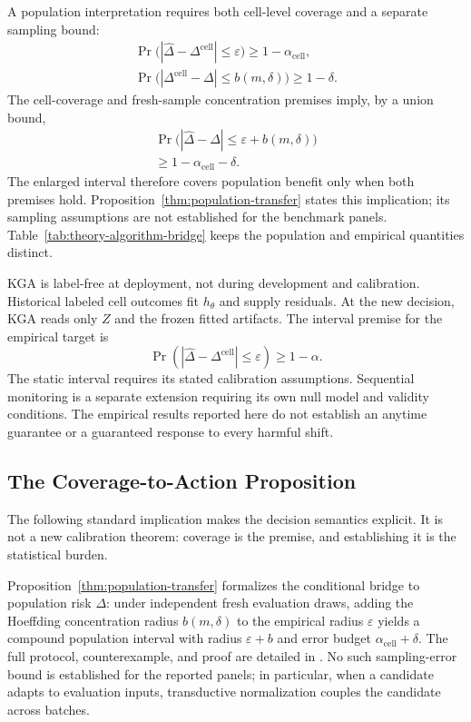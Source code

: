 A population interpretation requires both cell-level coverage and a separate sampling bound:
\begin{gather*}
  \Pr\bigl(|\widehat\Delta - \Delta^{\mathrm{cell}}| \le \varepsilon\bigr)
    \ge 1 - \alpha_{\mathrm{cell}}, \\
  \Pr\bigl(|\Delta^{\mathrm{cell}} - \Delta| \le b(m,\delta)\bigr)
    \ge 1 - \delta.
\end{gather*}
The cell-coverage and fresh-sample concentration premises imply, by a union bound,
\begin{multline*}
  \Pr\bigl(|\widehat\Delta - \Delta| \le \varepsilon + b(m,\delta)\bigr) \\
  \ge 1 - \alpha_{\mathrm{cell}} - \delta.
\end{multline*}
The enlarged interval therefore covers population benefit only when both premises hold.
Proposition~\ref{thm:population-transfer} states this implication; its sampling assumptions
are not established for the benchmark panels. Table~\ref{tab:theory-algorithm-bridge}
keeps the population and empirical quantities distinct.

KGA is label-free at deployment, not during development and calibration. Historical labeled cell outcomes fit $h_\theta$ and supply residuals. At the new decision, KGA reads only $Z$ and the frozen fitted artifacts. The interval premise for the empirical target is
\begin{equation}
 \Pr(|\widehat\Delta-\Delta^{\mathrm{cell}}|\le\varepsilon)\ge1-\alpha.
 \label{eq:compact-coverage}
\end{equation}
The static interval requires its stated calibration assumptions.
Sequential monitoring is a separate extension requiring its own
null model and validity conditions. The empirical results reported
here do not establish an anytime guarantee or a guaranteed response
to every harmful shift.

\subsection{The Coverage-to-Action Proposition}

The following standard implication makes the decision semantics explicit. It is not a new
calibration theorem: coverage is the premise, and establishing it is the statistical burden.



Proposition~\ref{thm:population-transfer} formalizes the conditional bridge to population risk $\Delta$: under independent fresh evaluation draws, adding the Hoeffding concentration radius $b(m,\delta)$ to the empirical radius $\varepsilon$ yields a compound population interval with radius $\varepsilon+b$ and error budget $\alpha_{\mathrm{cell}}+\delta$. The full protocol, counterexample, and proof are detailed in . No such sampling-error bound is established for the reported panels; in particular, when a candidate adapts to evaluation inputs, transductive normalization couples the candidate across batches.

